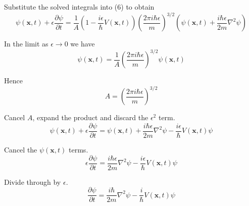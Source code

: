 Substitute the solved integrals into (6) to obtain
\begin{equation*}
\psi(\mathbf{x},t)+\epsilon\frac{\partial\psi}{\partial t}
=\frac{1}{A}
\left(1-\frac{i\epsilon}{\hbar}V\left(\mathbf x,t\right)\right)
\left(\frac{2\pi i\hbar\epsilon}{m}\right)^{3/2}
\left(
\psi(\mathbf x,t)+\frac{i\hbar\epsilon}{2m}\nabla^2\psi
\right)
\end{equation*}

In the limit as $\epsilon\rightarrow0$ we have
\begin{equation*}
\psi(\mathbf{x},t)=\frac{1}{A}\left(\frac{2\pi i\hbar\epsilon}{m}\right)^{3/2}\psi(\mathbf x,t)
\end{equation*}

Hence
\begin{equation*}
A=\left(\frac{2\pi i\hbar\epsilon}{m}\right)^{3/2}
\end{equation*}

Cancel $A$, expand the product and discard the $\epsilon^2$ term.
\begin{equation*}
\psi(\mathbf{x},t)+\epsilon\frac{\partial\psi}{\partial t}
=\psi(\mathbf{x},t)
+\frac{i\hbar\epsilon}{2m}\nabla^2\psi
-\frac{i\epsilon}{\hbar}V(\mathbf x,t)\psi
\end{equation*}

Cancel the $\psi(\mathbf x,t)$ terms.
\begin{equation*}
\epsilon\frac{\partial\psi}{\partial t}
=\frac{i\hbar\epsilon}{2m}\nabla^2\psi
-\frac{i\epsilon}{\hbar}V(\mathbf x,t)\psi
\end{equation*}

Divide through by $\epsilon$.
\begin{equation*}
\frac{\partial\psi}{\partial t}
=\frac{i\hbar}{2m}\nabla^2\psi
-\frac{i}{\hbar}V(\mathbf x,t)\psi
\tag{16}
\end{equation*}


